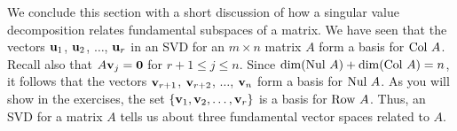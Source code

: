 
We conclude this section with a short discussion of how a singular value decomposition relates fundamental subspaces of a matrix. We have seen that the vectors $\mathbf{u}_1$, $\mathbf{u}_2$, $\ldots$, $\mathbf{u}_r$ in an SVD for an $m \times n$ matrix $A$ form a basis for $\text{Col } A$. Recall also that $A \mathbf{v}_j = \mathbf{0}$ for $r+1 \leq j \leq n$. Since $\dim(\text{Nul } A) + \dim(\text{Col } A) = n$, it follows that the vectors $\mathbf{v}_{r+1}$, $\mathbf{v}_{r+2}$, $\ldots$, $\mathbf{v}_n$ form a basis for $\text{Nul } A$.  As you will show in the exercises, the set $\{\mathbf{v}_1, \mathbf{v}_2, \ldots, \mathbf{v}_r\}$ is a basis for $\text{Row } A$.  Thus, an SVD for a matrix $A$ tells us about three fundamental vector spaces related to $A$.




